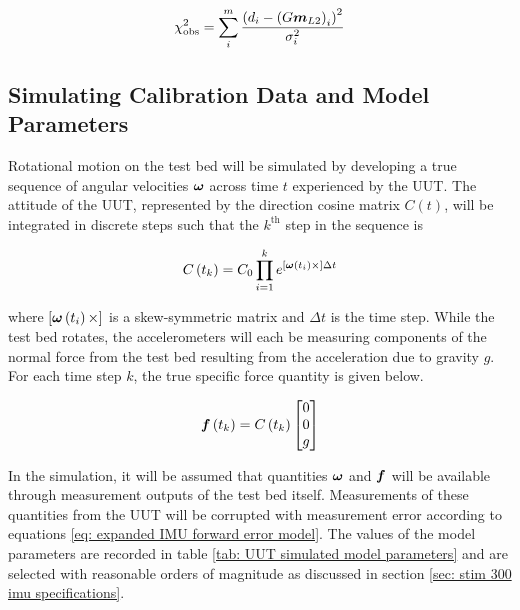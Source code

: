 \begin{align} \label{eq: chi-squared statistic}
	\chi^2_{\textrm{obs}} = \sum_{i}^{m} \frac{\left(d_i - \left(G \boldsymbol{m}_{L2}\right)_i\right)^2}{\sigma^2_i}
\end{align}


\subsection{Simulating Calibration Data and Model Parameters}

Rotational motion on the test bed will be simulated by developing a true sequence of angular velocities $\boldsymbol{\omega}$ across time $t$ experienced by the UUT. The attitude of the UUT, represented by the direction cosine matrix $C\left(t\right)$, will be integrated in discrete steps such that the $k^{\textrm{th}}$ step in the sequence is 

\begin{align}
	C\left(t_k\right) = C_0 \prod_{i = 1}^k e^{\left[\boldsymbol{\omega}\left(t_i\right) \times\right] \Delta t}
\end{align}  

where $\left[\boldsymbol{\omega}\left(t_i\right) \times\right]$ is a skew-symmetric matrix and $\Delta t$ is the time step. While the test bed rotates, the accelerometers will each be measuring components of the normal force from the test bed resulting from the acceleration due to gravity $g$. For each time step $k$, the true specific force quantity is given below.

\begin{align}
	\boldsymbol{f}\left(t_k\right) = C\left(t_k\right) \begin{bmatrix} 0 \\ 0 \\ g \end{bmatrix}
\end{align}

In the simulation, it will be assumed that quantities $\boldsymbol{\omega}$ and $\boldsymbol{f}$ will be available through measurement outputs of the test bed itself. Measurements of these quantities from the UUT will be corrupted with measurement error according to equations \ref{eq: expanded IMU forward error model}. The values of the model parameters are recorded in table \ref{tab: UUT simulated model parameters} and are selected with reasonable orders of magnitude as discussed in section \ref{sec: stim 300 imu specifications}. 

